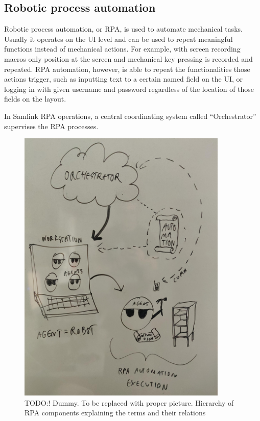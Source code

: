 

\subsection{Robotic process automation}\label{subsec:bg-rpa}

Robotic process automation, or RPA,
is used to automate mechanical tasks.
Usually it operates on the UI level
and can be used to repeat meaningful functions
instead of mechanical actions.
For example, with screen recording macros
only position at the screen and mechanical key pressing is recorded and repeated.
RPA automation, however,
is able to repeat the functionalities those actions trigger,
such as inputting text to a certain named field on the UI,
or logging in with given username and password
regardless of the location of those fields on the layout.


In Samlink RPA operations,
a central coordinating system called \enquote{Orchestrator}
supervises the RPA processes.


\begin{figure}[htb]
    \centering
    \includegraphics[width=100mm,angle=270]{./appendices/rpa-hierarchy}
    \caption{TODO:! Dummy. To be replaced with proper picture.
    Hierarchy of RPA components explaining the terms and their relations
        \label{fig:rpa-hierarchy}}
\end{figure}



